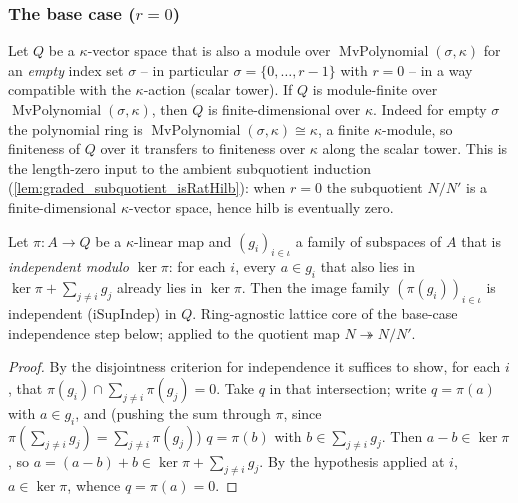 \subsubsection*{The base case ($r = 0$)}

\begin{lemma}
  \label{lem:graded_finiteDimensional_of_mvPolynomial_isEmpty_finite}
  Let \(Q\) be a \(\kappa\)-vector space that is also a module over
  \(\operatorname{MvPolynomial}(\sigma, \kappa)\) for an \emph{empty} index set
  \(\sigma\) -- in particular \(\sigma = \{0, \dots, r-1\}\) with \(r = 0\) -- in a way
  compatible with the \(\kappa\)-action (scalar tower). If \(Q\) is module-finite over
  \(\operatorname{MvPolynomial}(\sigma, \kappa)\), then \(Q\) is finite-dimensional over
  \(\kappa\). Indeed for empty \(\sigma\) the polynomial ring is
  \(\operatorname{MvPolynomial}(\sigma, \kappa) \cong \kappa\), a finite \(\kappa\)-module,
  so finiteness of \(Q\) over it transfers to finiteness over \(\kappa\) along the scalar
  tower. This is the length-zero input to the ambient subquotient induction
  (\cref{lem:graded_subquotient_isRatHilb}): when \(r = 0\) the subquotient \(N/N'\) is a
  finite-dimensional \(\kappa\)-vector space, hence \(\mathrm{hilb}\) is eventually zero.
\end{lemma}

\begin{lemma}

  \label{lem:graded_iSupIndep_map_of_mem_ker_sup}
  Let \(\pi : A \to Q\) be a \(\kappa\)-linear map and \((g_i)_{i \in \iota}\) a family of
  subspaces of \(A\) that is \emph{independent modulo \(\ker\pi\)}: for each \(i\), every
  \(a \in g_i\) that also lies in \(\ker\pi + \sum_{j \ne i} g_j\) already lies in
  \(\ker\pi\). Then the image family \((\pi(g_i))_{i \in \iota}\) is independent
  (\(\mathrm{iSupIndep}\)) in \(Q\). Ring-agnostic lattice core of the base-case
  independence step below; applied to the quotient map \(N \twoheadrightarrow N/N'\).
\end{lemma}
\begin{proof}

\leanok
  By the disjointness criterion for independence it suffices to show, for each \(i\),
  that \(\pi(g_i) \cap \sum_{j \ne i} \pi(g_j) = 0\). Take \(q\) in that intersection;
  write \(q = \pi(a)\) with \(a \in g_i\), and (pushing the sum through \(\pi\), since
  \(\pi(\sum_{j\ne i} g_j) = \sum_{j\ne i}\pi(g_j)\)) \(q = \pi(b)\) with
  \(b \in \sum_{j \ne i} g_j\). Then \(a - b \in \ker\pi\), so
  \(a = (a-b) + b \in \ker\pi + \sum_{j \ne i} g_j\). By the hypothesis applied at \(i\),
  \(a \in \ker\pi\), whence \(q = \pi(a) = 0\).
\end{proof}

